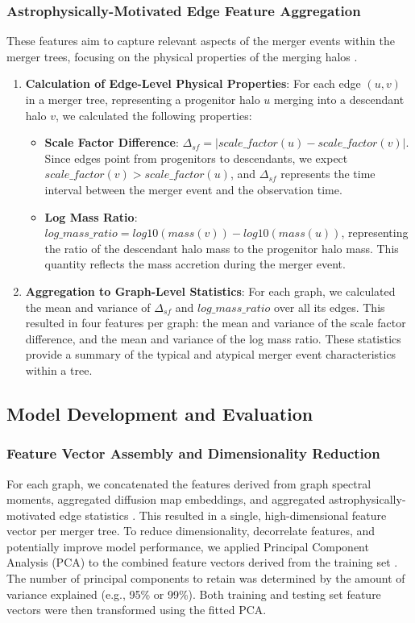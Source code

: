 \documentclass[twocolumn]{aastex631}
\begin{document}
\subsubsection{Astrophysically-Motivated Edge Feature Aggregation}
These features aim to capture relevant aspects of the merger events within the merger trees, focusing on the physical properties of the merging halos \citep{jespersen2022textttmangrovelearninggalaxyproperties,jung2024mergertreebasedgalaxymatching,chandrogómez2025accuracydarkmatterhalo}.
\begin{enumerate}
    \item \textbf{Calculation of Edge-Level Physical Properties}: For each edge $(u, v)$ in a merger tree, representing a progenitor halo $u$ merging into a descendant halo $v$, we calculated the following properties:
    \begin{itemize}
        \item \textbf{Scale Factor Difference}: $\Delta_{sf} = |scale\_factor(u) - scale\_factor(v)|$. Since edges point from progenitors to descendants, we expect $scale\_factor(v) > scale\_factor(u)$, and $\Delta_{sf}$ represents the time interval between the merger event and the observation time.
        \item \textbf{Log Mass Ratio}: $log\_mass\_ratio = log10(mass(v)) - log10(mass(u))$, representing the ratio of the descendant halo mass to the progenitor halo mass. This quantity reflects the mass accretion during the merger event.
    \end{itemize}
    \item \textbf{Aggregation to Graph-Level Statistics}: For each graph, we calculated the mean and variance of $\Delta_{sf}$ and $log\_mass\_ratio$ over all its edges. This resulted in four features per graph: the mean and variance of the scale factor difference, and the mean and variance of the log mass ratio. These statistics provide a summary of the typical and atypical merger event characteristics within a tree.
\end{enumerate}

\subsection{Model Development and Evaluation}
\subsubsection{Feature Vector Assembly and Dimensionality Reduction}
For each graph, we concatenated the features derived from graph spectral moments, aggregated diffusion map embeddings, and aggregated astrophysically-motivated edge statistics \citep{sun2024knowledgegraphastronomicalresearch}. This resulted in a single, high-dimensional feature vector per merger tree. To reduce dimensionality, decorrelate features, and potentially improve model performance, we applied Principal Component Analysis (PCA) to the combined feature vectors derived from the training set \citep{ma2025characterizingdarkmattersubhalo}. The number of principal components to retain was determined by the amount of variance explained (e.g., 95\% or 99\%). Both training and testing set feature vectors were then transformed using the fitted PCA.
\end{document}
